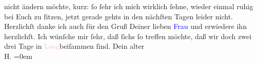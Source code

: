                   nicht ändern möchte\label{LL287-1h}, kurz: ſo ſehr ich mich wirklich ſehne, wieder einmal
               ruhig bei Euch zu ſitzen, jetzt gerade gehts in den nächſten Tagen leider nicht.\pend
           \pstart
           {\pb}Herzlichſt danke ich auch für den Gruß Deiner
               lieben \textcolor{blue}{Frau}{} und erwiedere ihn
               herzlichſt.\pend
           \pstart
           Ich wünſche mir ſehr, daß ſichs ſo treffen möchte, daß wir doch zwei drei Tage in \textcolor{pink}{Lueg}{}\ledrightnote{\textcolor{pink}{Lueg am Wolfgangsee}}{ }\label{LL287-4v}beiſammen ſind\label{LL287-4h}.\pend
           \pstart
           Dein alter{\\[\baselineskip]}\spacefill\mbox{H.}\pend
           \leftskip=0em{}\endnumbering{}  
      